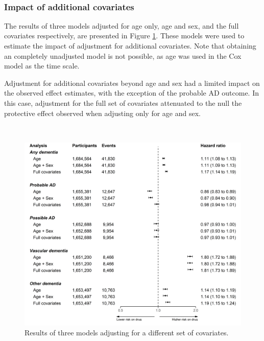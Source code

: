 \documentclass[a4paper, twoside]{templates/ociamthesis}
\begin{document}
~

\hypertarget{impact-of-additional-covariates-1}{%
\subsubsection{Impact of additional covariates}\label{impact-of-additional-covariates-1}}

The results of three models adjusted for age only, age and sex, and the full covariates respectively, are presented in Figure \ref{fig:unadjustedComparisonFig}. These models were used to estimate the impact of adjustment for additional covariates. Note that obtaining an completely unadjusted model is not possible, as age was used in the Cox model as the time scale.

Adjustment for additional covariates beyond age and sex had a limited impact on the observed effect estimates, with the exception of the probable AD outcome. In this case, adjustment for the full set of covariates attenuated to the null the protective effect observed when adjusting only for age and sex.

~





\begin{figure}[H]
\includegraphics[width=1\linewidth]{figures/cprd-analysis/forester_unadjusted} \caption[Comparison of different combinations of covariates]{Results of three models adjusting for a different set of covariates.}\label{fig:unadjustedComparisonFig}
\end{figure}
\end{document}
